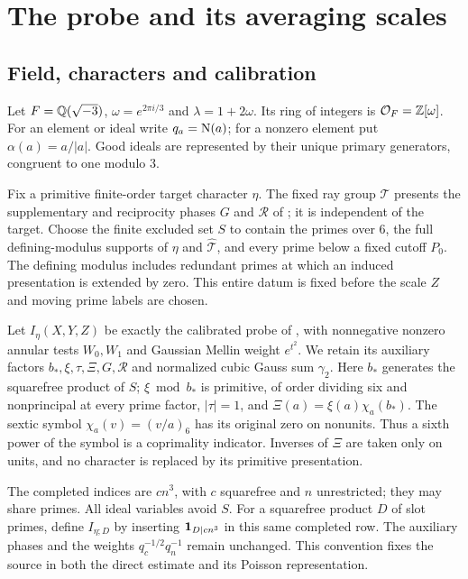 \section{The probe and its averaging scales}\label{gex:source-section}

\subsection{Field, characters and calibration}

Let $F=\mathbb Q(\sqrt{-3})$, $\omega=e^{2\pi i/3}$ and
$\lambda=1+2\omega$. Its ring of integers is $\mathcal O_F=\mathbb Z[\omega]$.
For an element or ideal write $q_a=\mathrm N(a)$; for a nonzero element put
$\alpha(a)=a/|a|$. Good ideals are represented by their unique
primary generators, congruent to one modulo $3$.

Fix a primitive finite-order target character $\eta$. The fixed ray
group $\mathcal T$ presents the supplementary and reciprocity phases
$G$ and $\mathcal R$ of \cite[Section 4]{OAI26}; it is independent
of the target. Choose the finite excluded set $S$ to contain the
primes over $6$, the full defining-modulus supports of $\eta$ and
$\widehat{\mathcal T}$, and every prime below a fixed cutoff $P_0$.
The defining modulus includes redundant primes at which an induced
presentation is extended by zero. This entire datum is fixed before
the scale $Z$ and moving prime labels are chosen.

Let $I_\eta(X,Y,Z)$ be exactly the calibrated probe of
\cite[(6.1), Section 6.1]{OAI26}, with nonnegative nonzero annular
tests $W_0,W_1$ and Gaussian Mellin weight $e^{t^2}$.
We retain its auxiliary factors $b_*,\xi,\tau,\Xi,G,\mathcal R$
and normalized cubic Gauss sum $\gamma_2$.
Here $b_*$ generates the squarefree product of $S$;
$\xi\bmod b_*$ is primitive, of order dividing six and nonprincipal
at every prime factor, $|\tau|=1$, and
$\Xi(a)=\xi(a)\chi_a(b_*)$.
The sextic symbol $\chi_a(v)=(v/a)_6$ has its original zero on
nonunits. Thus a sixth power of the symbol is a coprimality
indicator. Inverses of $\Xi$ are taken only on units, and no
character is replaced by its primitive presentation.

The completed indices are $cn^3$, with $c$ squarefree and $n$
unrestricted; they may share primes. All ideal variables avoid $S$.
For a squarefree product $D$ of slot primes, define $I_{\eta;D}$
by inserting $\mathbf1_{D\mid cn^3}$ in this same completed row.
The auxiliary phases and the weights $q_c^{-1/2}q_n^{-1}$
remain unchanged. This convention fixes the source in both the
direct estimate and its Poisson representation.

